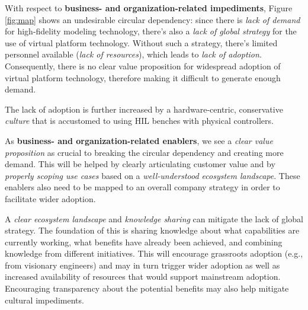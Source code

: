 With respect to \textbf{business- and organization-related impediments}, Figure \ref{fig:map} shows an undesirable circular dependency:
since there is \emph{lack of demand} for high-fidelity modeling technology,
there's also a \emph{lack of global strategy} for the use of virtual platform technology.
Without such a strategy, there's limited personnel available (\emph{lack of resources}),
which leads to \emph{lack of adoption}.
Consequently, there is no clear value proposition for widespread adoption of virtual platform technology, therefore making it difficult to generate enough demand.

The lack of adoption is further increased by a hardware-centric, conservative \emph{culture} that is accustomed to using HIL benches with physical controllers.

As \textbf{business- and organization-related enablers}, %
we see a \emph{clear value proposition} as crucial to breaking the circular dependency and creating more demand.
This will be helped by clearly articulating customer value and by \emph{properly scoping use cases} based on a \emph{well-understood ecosystem landscape}.
These enablers also need to be mapped to an overall company strategy in order to facilitate wider adoption. 

A \emph{clear ecosystem landscape} and \emph{knowledge sharing} can mitigate the lack of global strategy.
The foundation of this is sharing knowledge about what capabilities are currently working, what benefits have already been achieved, and combining knowledge from different initiatives.
This will encourage grassroots adoption (e.g., from visionary engineers) and may in turn trigger wider adoption
as well as increased availability of resources that would support mainstream adoption. Encouraging transparency about the potential benefits may also help mitigate cultural impediments.

